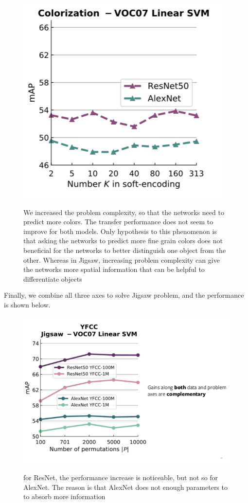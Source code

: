 \begin{figure}[H]
\centering
\includegraphics[width=0.6\linewidth]{figs/colorization2.png}
\label{fig:colorization2}
\caption{We increased the problem complexity, so that the networks need to predict more colors. The transfer performance does not seem to improve for both models. Only hypothesis to this phenomenon is that asking the networks to predict more fine grain colors does not beneficial for the networks to better distinguish one object from the other. Whereas in Jigsaw, increasing problem complexity can give the networks more spatial information that can be helpful to differentiate objects}
\end{figure}

Finally, we combine all three axes to solve Jigsaw problem, and the performance  is shown below.

\begin{figure}[H]
\centering
\includegraphics[width=0.8\linewidth]{figs/combined.png}
\label{fig:combined}
\caption{for ResNet, the performance increase is noticeable, but not so for AlexNet. The reason is that AlexNet does not enough parameters to to absorb more information}
\end{figure}


